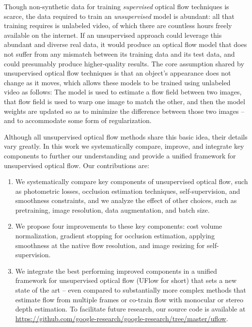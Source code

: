 \documentclass[runningheads]{llncs}
\begin{document}
Though non-synthetic data for training \emph{supervised} optical flow techniques is scarce, the data required to train an \emph{unsupervised} model is abundant: all that training requires is unlabeled video, of which there are countless hours freely available on the internet.
If an unsupervised approach could leverage this abundant and diverse real data, it would produce an optical flow model that does not suffer from any mismatch between its training data and its test data, and could presumably produce higher-quality results.
The core assumption shared by unsupervised optical flow techniques is that an object's appearance does not change as it moves, which allows these models to be trained using unlabeled video as follows: The model is used to estimate a flow field between two images, that flow field is used to warp one image to match the other, and then the model weights are updated so as to minimize the difference between those two images -- and to accommodate some form of regularization. 

Although all unsupervised optical flow methods share this basic idea, their details vary greatly. In this work we systematically compare, improve, and integrate key components to further our understanding and provide a unified framework for unsupervised optical flow. Our contributions are:
\begin{enumerate}[leftmargin=*,itemindent=0pt,parsep=0pt,topsep=0pt]
\item We systematically compare key components of unsupervised optical flow, such as photometric losses, occlusion estimation techniques, self-supervision, and smoothness constraints, and we analyze the effect of other choices, such as pretraining, image resolution, data augmentation, and batch size.
\item We propose four improvements to these key components: cost volume normalization, gradient stopping for occlusion estimation, applying smoothness at the native flow resolution, and image resizing for self-supervision.
\item We integrate the best performing improved components in a unified framework for unsupervised optical flow (UFlow for short) that sets a new state of the art -- even compared to substantially more complex methods that estimate flow from multiple frames or co-train flow with monocular or stereo depth estimation. To facilitate future research, our source code is available at \url{https://github.com/google-research/google-research/tree/master/uflow}.
\end{enumerate}
\end{document}
